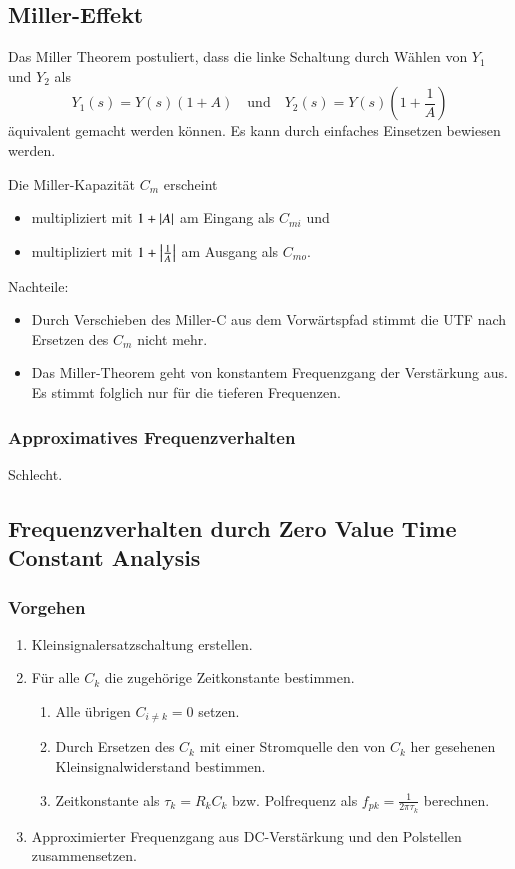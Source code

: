 \subsection{Miller-Effekt}
Das Miller Theorem postuliert, dass die linke Schaltung durch Wählen von $Y_1$ und $Y_2$ als 
\[
    Y_1(s) = Y(s) (1+A) \quad\text{und}\quad Y_2(s) = Y(s) (1+\frac{1}{A})
\]
äquivalent gemacht werden können.
Es kann durch einfaches Einsetzen bewiesen werden.

Die Miller-Kapazität $C_m$ erscheint 
\begin{itemize}
    \item multipliziert mit $1+\left|A\right|$ am Eingang als $C_{mi}$ und
    \item multipliziert mit $1+\left|\frac{1}{A}\right|$ am Ausgang als $C_{mo}$.
\end{itemize}

Nachteile: 
\begin{itemize}
    \item Durch Verschieben des Miller-C aus dem Vorwärtspfad stimmt die UTF nach Ersetzen des $C_m$ nicht mehr.
    \item Das Miller-Theorem geht von konstantem Frequenzgang der Verstärkung aus. Es stimmt folglich nur für die tieferen Frequenzen.
\end{itemize}

\subsubsection{Approximatives Frequenzverhalten}
Schlecht.

\subsection{Frequenzverhalten durch Zero Value Time Constant Analysis}


\subsubsection{Vorgehen}
\begin{enumerate}
    \item Kleinsignalersatzschaltung erstellen.
    \item Für alle $C_k$ die zugehörige Zeitkonstante bestimmen.
    \begin{enumerate}
        \item Alle übrigen $C_{i \neq k} = 0$ setzen.
        \item Durch Ersetzen des $C_k$ mit einer Stromquelle den von $C_k$ her gesehenen Kleinsignalwiderstand bestimmen.
        \item Zeitkonstante als $\tau_k = R_k C_k$ bzw. Polfrequenz als $f_{pk} = \frac{1}{2 \pi \tau_k}$ berechnen.
    \end{enumerate}
    \item Approximierter Frequenzgang aus DC-Verstärkung und den Polstellen zusammensetzen.
\end{enumerate}

